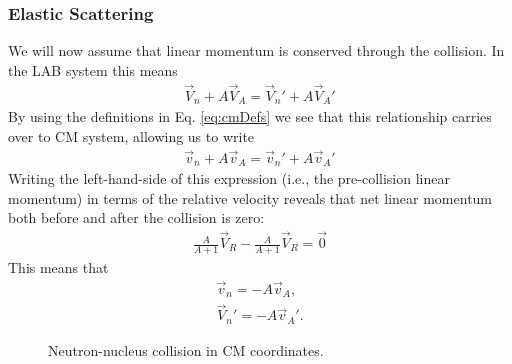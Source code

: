 \documentclass[11pt]{article}
\begin{document}
\subsubsection{Elastic Scattering}
\label{sec:orgheadline3}

We will now assume that linear momentum is conserved through the collision.  In the LAB system this means
\begin{align*}
  \vec{V}_n + A\vec{V}_A = \vec{V}_n' + A\vec{V}_A'
\end{align*}
By using the definitions in Eq. \eqref{eq:cmDefs} we see that this relationship carries over to CM system, allowing us to write
\begin{align*}
  \vec{v}_n + A\vec{v}_A = \vec{v}_n' + A\vec{v}_A'
\end{align*}
Writing the left-hand-side of this expression (i.e., the pre-collision linear momentum) in terms of the relative velocity reveals that net linear momentum both before and after the collision is zero:
\begin{align*}
  \frac{A}{A+1}\vec{V}_R - \frac{A}{A+1}\vec{V}_R = \vec{0}
\end{align*}
This means that
\begin{align*}
  \vec{v}_n = -A \vec{v}_A, \\
  \vec{V}_n' = -A \vec{v}_A'.
\end{align*}

\begin{figure}
\centering
{}
\caption{Neutron-nucleus collision in CM coordinates.}
\end{figure}
\end{document}
